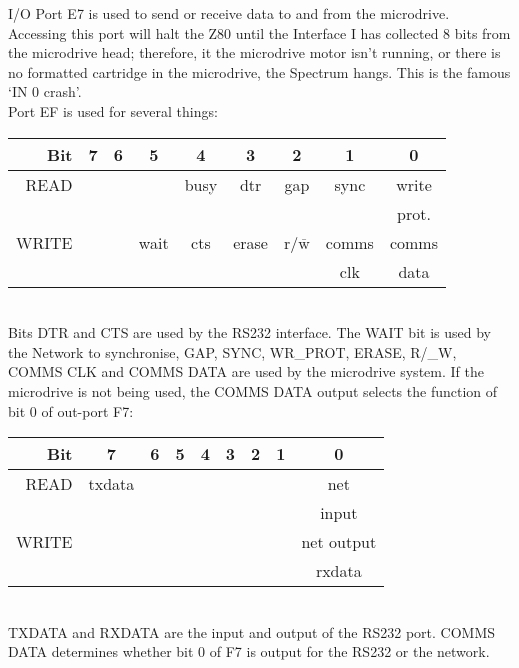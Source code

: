    I/O Port E7 is used to send or receive data to and from the microdrive.
    Accessing this port will halt the Z80 until the Interface I has
    collected 8 bits from the microdrive head; therefore, it the microdrive
    motor isn't running, or there is no formatted cartridge in the
    microdrive, the Spectrum hangs.  This is the famous `IN 0 crash'.\\
\noindent
    Port EF is used for several things:\\

\begin{tabular}{|r||c|c|c|c|c|c|c|c|}
  \hline
     Bit  & 7 & 6 &  5  &  4   &  3  &   2  &  1   &  0\\
  \hline
  \hline
    READ  &   &   &      & busy &  dtr  & gap  & sync  & write\\
          &   &   &      &      &       &      &       & prot.\\
  \hline
    WRITE &   &   & wait & cts  & erase & r/$\overline{\mbox{w}}$ & comms & comms\\
          &   &   &      &      &       &      &  clk  & data\\
  \hline
\end{tabular}\\

\noindent
    Bits DTR and CTS are used by the RS232 interface.  The WAIT bit is used
    by the Network to synchronise, GAP, SYNC, WR\_PROT, ERASE, R/\_W, COMMS
    CLK and COMMS DATA are used by the microdrive system.  If the microdrive
    is not being used, the COMMS DATA output selects the function of bit 0
    of out-port F7:\\

\begin{tabular}{|r||c|c|c|c|c|c|c|c|}
  \hline
    Bit  &    7   &  6  &  5  &  4  &  3  &  2  &  1   &   0\\
  \hline
  \hline
    READ & txdata &     &     &     &     &     &      & net\\
         &        &     &     &     &     &     &      & input\\
  \hline
   WRITE &        &     &     &     &     &     &      & net output\\
         &        &     &     &     &     &     &      & rxdata\\
  \hline
\end{tabular}\\

\noindent
    TXDATA and RXDATA are the input and output of the RS232 port.  COMMS
    DATA determines whether bit 0 of F7 is output for the RS232 or the
    network.



